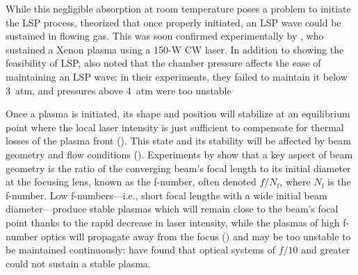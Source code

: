         While this negligible absorption at room temperature poses a problem to initiate the LSP process, \textcite{raizerSubsonicPropagationLight1970} theorized that once properly initiated, an LSP wave could be sustained in flowing gas. This was soon confirmed experimentally by \textcite{generalovContinuousOpticalDischarge1970}, who sustained a Xenon plasma using a 150-W CW  laser. In addition to showing the feasibility of LSP, \citeauthor{generalovContinuousOpticalDischarge1970} also noted that the chamber pressure affects the ease of maintaining an LSP wave: in their experiments, they failed to maintain it below 3~\unit{atm}, and pressures above 4~\unit{atm} were too unstable

        Once a plasma is initiated, its shape and position will stabilize at an equilibrium point where the local laser intensity is just sufficient to compensate for thermal losses of the plasma front (\textcite{keeferLaserSustainedPlasmas1989}). This state and its stability will be affected by beam geometry and flow conditions (\textcite{welleEnergyConversionEfficiency1986}). Experiments by \textcite{fowlerIgnitionMaintenanceSubsonic1975} show that a key aspect of beam geometry is the ratio of the converging beam's focal length to its initial diameter at the focusing lens, known as the f-number, often denoted $f/N_\mathrm{f}$, where $N_\mathrm{f}$ is the f-number. Low f-numbers---i.e., short focal lengths with a wide initial beam diameter---produce stable plasmas which will remain close to the beam's focal point thanks to the rapid decrease in laser intensity, while the plasmas of high f-number optics will propagate away from the focus (\textcite{keeferLaserSustainedPlasmas1989}) and may be too unstable to be maintained continuously: \citeauthor{fowlerIgnitionMaintenanceSubsonic1975} have found that optical systems of $f/10$ and greater could not sustain a stable plasma.

